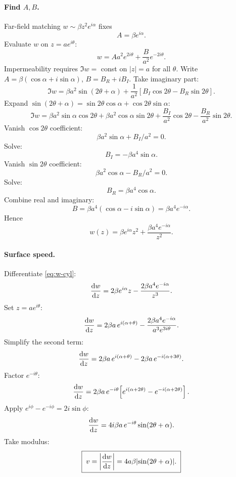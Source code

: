 \documentclass[11pt]{article}
\begin{document}
\paragraph{Find $A,B$.} Far-field matching $w\sim\beta z^{2}e^{i\alpha}$ fixes
\[ A = \beta e^{i\alpha}. \]
Evaluate $w$ on $z=ae^{i\theta}$:
\[ w = Aa^{2}e^{2i\theta} + \frac{B}{a^{2}}e^{-2i\theta}. \]
Impermeability requires $\Im w=$ const on $|z|=a$ for all $\theta$. Write $A=\beta(\cos\alpha+i\sin\alpha)$, $B=B_R+iB_I$. Take imaginary part:
\[ \Im w = \beta a^{2}\sin(2\theta+\alpha) + \frac{1}{a^{2}}[B_I\cos 2\theta - B_R\sin 2\theta]. \]
Expand $\sin(2\theta+\alpha)=\sin 2\theta\cos\alpha + \cos 2\theta\sin\alpha$:
\[ \Im w = \beta a^{2}\sin\alpha\cos 2\theta + \beta a^{2}\cos\alpha\sin 2\theta + \frac{B_I}{a^{2}}\cos 2\theta - \frac{B_R}{a^{2}}\sin 2\theta. \]
Vanish $\cos 2\theta$ coefficient:
\[ \beta a^{2}\sin\alpha + B_I/a^{2} = 0. \]
Solve:
\[ B_I = -\beta a^{4}\sin\alpha. \]
Vanish $\sin 2\theta$ coefficient:
\[ \beta a^{2}\cos\alpha - B_R/a^{2} = 0. \]
Solve:
\[ B_R = \beta a^{4}\cos\alpha. \]
Combine real and imaginary:
\[ B = \beta a^{4}(\cos\alpha - i\sin\alpha) = \beta a^{4}e^{-i\alpha}. \]
Hence
\begin{equation}
\boxed{\;w(z) = \beta e^{i\alpha}z^{2} + \frac{\beta a^{4}e^{-i\alpha}}{z^{2}}.\;}
\label{eq:w-cyl}
\end{equation}

\paragraph{Surface speed.} Differentiate \eqref{eq:w-cyl}:
\[ \dv{w}{z} = 2\beta e^{i\alpha}z - \frac{2\beta a^{4}e^{-i\alpha}}{z^{3}}. \]
Set $z=ae^{i\theta}$:
\[ \dv{w}{z} = 2\beta a\,e^{i(\alpha+\theta)} - \frac{2\beta a^{4}e^{-i\alpha}}{a^{3}e^{3i\theta}}. \]
Simplify the second term:
\[ \dv{w}{z} = 2\beta a\,e^{i(\alpha+\theta)} - 2\beta a\,e^{-i(\alpha+3\theta)}. \]
Factor $e^{-i\theta}$:
\[ \dv{w}{z} = 2\beta a\,e^{-i\theta}\!\left[e^{i(\alpha+2\theta)} - e^{-i(\alpha+2\theta)}\right]. \]
Apply $e^{i\phi}-e^{-i\phi}=2i\sin\phi$:
\[ \dv{w}{z} = 4i\beta a\,e^{-i\theta}\sin(2\theta+\alpha). \]
Take modulus:
\begin{equation}
\boxed{\;v = \abs{\dv{w}{z}} = 4a\beta\abs{\sin(2\theta+\alpha)}.\;}
\label{eq:vsurf}
\end{equation}
\end{document}
